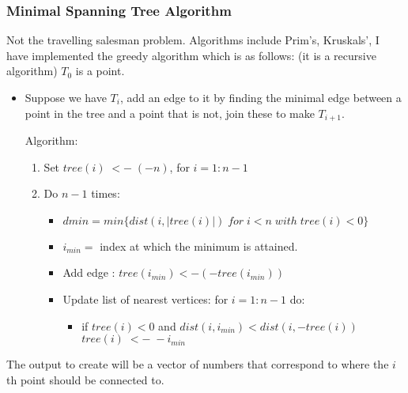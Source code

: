 \documentclass{article}
\begin{document}
\subsubsection*{ Minimal Spanning Tree Algorithm}
Not the travelling salesman problem.
Algorithms include Prim's, Kruskals', 
I have implemented
the greedy algorithm which is as follows:
(it is a recursive algorithm)
$T_0$ is a point.
\begin{itemize}
\item Suppose we have $T_{i}$, add an edge to it
by finding the minimal edge between a point
in the tree and a point that is not, join these
to make $T_{i+1}$.

Algorithm:\\
\begin{enumerate}
\item Set $tree(i)\; <-\; (-n)$, for $i =1:n-1$ 
\item Do $n-1$ times:
\begin{itemize}
\item $dmin= min\{ dist(i, |tree(i)|)\; for\; i <n\; with\; tree(i)<0\}$
\item $i_{min}=$ index at which the minimum is attained.
\item Add edge : $tree(i_{min}) <- (-tree(i_{min}))$
\item Update list of nearest vertices: for $i=1:n-1$ do:
\begin{itemize}
\item if $tree(i)<0$ and $dist(i,i_{min})< dist(i,-tree(i))$\\
$tree(i)\; <-\; -i_{min}$
\end{itemize}
\end{itemize}
\end{enumerate}
\end{itemize}

The output to create will be a vector of numbers
that correspond to where the $i$th point should be connected
to.
\end{document}
